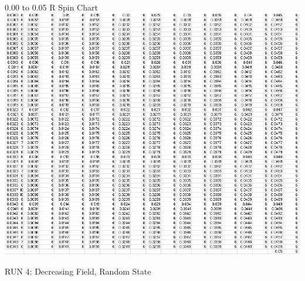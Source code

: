 \documentclass{article}
\begin{document}
\begin{center}
\LARGE 0.00 to 0.05 R Spin Chart
 \includegraphics[keepaspectratio,scale=0.7]{000to005RSpinChart.png}
\end{center}
\pagebreak

\thispagestyle{plain}
\begin{center}
\LARGE
RUN 4: Decreasing Field, Random State
\end{center}
\end{document}
